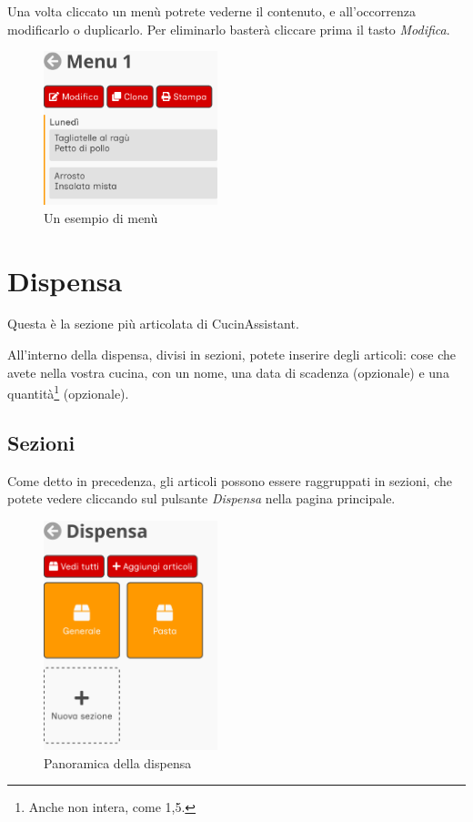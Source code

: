 \documentclass[12pt, a4paper]{report}
\begin{document}
    Una volta cliccato un menù potrete vederne il contenuto, e all'occorrenza modificarlo o duplicarlo. Per eliminarlo basterà cliccare
    prima il tasto \emph{Modifica}.

    \begin{figure}[H]
        \centering
        \includegraphics[width=0.45\textwidth]{assets/it/menu.png}
        \caption{Un esempio di menù}
    \end{figure}



    \chapter{Dispensa}

    Questa è la sezione più articolata di CucinAssistant.

    All'interno della dispensa, divisi in sezioni, potete inserire degli articoli: cose che avete nella vostra cucina, con un nome, una data di
    scadenza (opzionale) e una quantità\footnote{Anche non intera, come 1,5.} (opzionale).

	\section{Sezioni} \label{storagearticles}

    Come detto in precedenza, gli articoli possono essere raggruppati in sezioni, che potete vedere cliccando sul pulsante \emph{Dispensa} nella
    pagina principale.

    \begin{figure}[H]
        \centering
        \includegraphics[width=0.45\textwidth]{assets/it/storage.png}
        \caption{Panoramica della dispensa}
    \end{figure}
\end{document}

